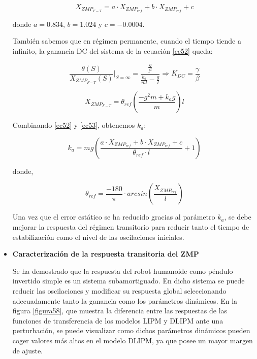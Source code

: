 \begin{itemize}
\begin{equation}
X_{ZMP_{F-T}} = a \cdot X_{ZMP_{ref}} + b \cdot X_{ZMP_{ref}} + c
\label{ec53}
\end{equation}

donde $a=0.834$, $b=1.024$ y $c=-0.0004$.



También sabemos que en régimen permanente, cuando el tiempo tiende a infinito, la ganancia DC del sistema de la ecuación \ref{ec52} queda:

\begin{equation}
\frac{\theta(S)}{X_{ZMP_{F-T}}(S)}|_{S=\infty}=\frac{\frac{g}{l^2}}{\frac{k_a}{ml} - \frac{g}{l}}\Rightarrow K_{DC}=\frac{\gamma}{\beta}
\label{ec54}
\end{equation}

\begin{equation}
X_{ZMP_{F-T}}=\theta_{ref}(\frac{-g^{2}m+k_{a}g}{m})l
\label{ec55}
\end{equation}

Combinando \ref{ec52} y \ref{ec53}, obtenemos $k_a$:

\begin{equation}
k_a=mg(\frac{a \cdot X_{ZMP_{ref}} + b \cdot X_{ZMP_{ref}} + c}{\theta_{ref}\cdot l}+1)
\label{ec56}
\end{equation}

donde,

\begin{equation}
\theta_{ref}=\frac{-180}{\pi}\cdot arcsin(\frac{X_{ZMP_{ref}}}{l})
\label{ec57}
\end{equation}

Una vez que el error estático se ha reducido gracias al parámetro $k_a$, se debe mejorar la respuesta del régimen transitorio para reducir tanto el tiempo de estabilización como el nivel de las oscilaciones iniciales.

\item \textbf{Caracterización de la respuesta transitoria del ZMP}

Se ha demostrado que la respuesta del robot humanoide como péndulo invertido simple es un sistema subamortiguado. En dicho sistema se puede reducir las oscilaciones y modificar su respuesta global seleccionando adecuadamente tanto la ganancia como los parámetros dinámicos. En la figura \ref{figura58}, que muestra la diferencia entre las respuestas de las funciones de transferencia de los modelos LIPM y DLIPM ante una perturbación, se puede visualizar como dichos parámetros dinámicos pueden coger valores más altos en el modelo DLIPM, ya que posee un mayor margen de ajuste. 


\end{itemize}
